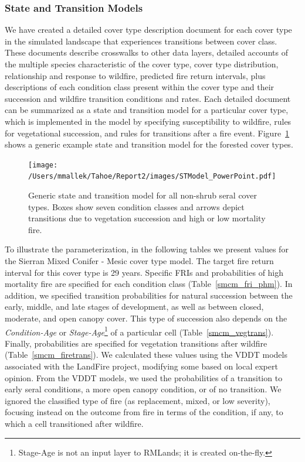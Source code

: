 \subsubsection{State and Transition Models}
We have created a detailed cover type description document for each cover type in the simulated landscape that experiences transitions between cover class. These documents describe crosswalks to other data layers, detailed accounts of the multiple species characteristic of the cover type, cover type distribution, relationship and response to wildfire, predicted fire return intervals, plus descriptions of each condition class present within the cover type and their succession and wildfire transition conditions and rates.  Each detailed document can be summarized as a state and transition model for a particular cover type, which is implemented in the model by specifying susceptibility to wildfire, rules for vegetational succession, and rules for transitions after a fire event. Figure~\ref{transmodel} shows a generic example state and transition model for the forested cover types.

\begin{figure}[htbp]
\centering
\texttt{[image: /Users/mmallek/Tahoe/Report2/images/STModel\_PowerPoint.pdf]}
\caption{Generic state and transition model for all non-shrub seral cover types. Boxes show seven condition classes and arrows depict transitions due to vegetation succession and high or low mortality fire.} 
\label{transmodel}
\end{figure}

To illustrate the parameterization, in the following tables we present values for the Sierran Mixed Conifer - Mesic cover type model. The target fire return interval for this cover type is 29 years. Specific FRIs and probabilities of high mortality fire are specified for each condition class (Table~\ref{smcm_fri_phm}). In addition, we specified transition probabilities for natural succession between the early, middle, and late stages of development, as well as between closed, moderate, and open canopy cover. This type of succession also depends on the \emph{Condition-Age} or \emph{Stage-Age}\footnote{Stage-Age is not an input layer to RMLands; it is created on-the-fly.} of a particular cell (Table~\ref{smcm_vegtrans}). Finally, probabilities are specified for vegetation transitions after wildfire (Table~\ref{smcm_firetrans}). We calculated these values using the VDDT models associated with the LandFire project, modifying some based on local expert opinion. From the VDDT models, we used the probabilities of a transition to early seral conditions, a more open canopy condition, or of no transition. We ignored the classified type of fire (as replacement, mixed, or low severity), focusing instead on the outcome from fire in terms of the condition, if any, to which a cell transitioned after wildfire.


